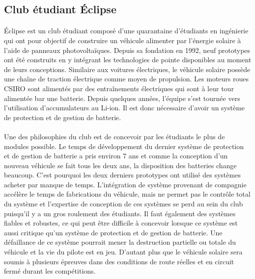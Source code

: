 		
	\subsection{Club étudiant Éclipse}
		
		\paragraph{}
		Éclipse est un club étudiant composé d'une quarantaine d'étudiants en ingénierie qui ont pour objectif de construire un véhicule alimenter par l'énergie solaire à l'aide de panneaux photovoltaïques. Depuis sa fondation en 1992, neuf prototypes ont été construits en y intégrant les technologies de pointe disponibles au moment de leurs conceptions. Similaire aux voitures électriques, le véhicule solaire possède une chaîne de traction électrique comme moyen de propulsion. Les moteurs roues  CSIRO sont alimentés par des entraînements électriques qui sont à leur tour alimentée bar une batterie. Depuis quelques années, l'équipe s'est tournée vers l'utilisation d'accumulateurs au Li-ion. Il est donc nécessaire d'avoir un système de protection et de gestion de batterie.
		
		\paragraph{}
		Une des philosophies du club est de concevoir par les étudiants le plus de modules possible. Le temps de développement du dernier système de protection et de gestion de batterie a pris environ 7 ans et comme la conception d'un nouveau véhicule se fait tous les deux ans, la disposition des batteries change beaucoup. C'est pourquoi les deux derniers prototypes ont utilisé des systèmes acheter par manque de temps. L'intégration de système provenant de compagnie accélère le temps de fabrications du véhicule, mais ne permet pas le contrôle total du système et l'expertise de conception de ces systèmes se perd au sein du club puisqu'il y a un gros roulement des étudiants. Il faut également des systèmes fiables et robustes, ce qui peut être difficile à concevoir lorsque ce système est aussi critique qu'un système de protection et de gestion de batterie. Une défaillance de ce système pourrait mener la destruction partielle ou totale du véhicule et la vie du pilote est en jeu. D'autant plus que le véhicule solaire sera soumis à plusieurs épreuves dans des conditions de route réelles et en circuit fermé durant les compétitions.
			
